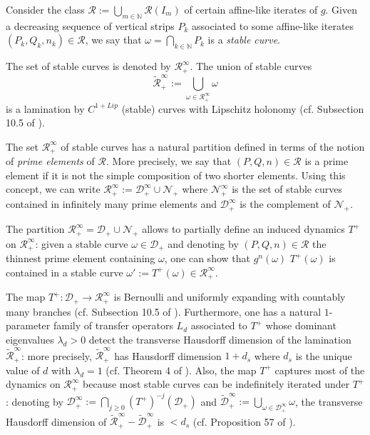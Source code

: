 \documentclass[12pt]{amsart}
\numberwithin{equation}{section}
\theoremstyle{definition}
\newcommand{\<}{{\langle}}
\renewcommand{\>}{{\rangle}}
\begin{document}
Consider the class $\mathcal{R}:=\bigcup\limits_{m\in\mathbb{N}}\mathcal{R}(I_m)$ of certain affine-like iterates of $g$. Given a decreasing sequence of vertical strips $P_k$ associated to some affine-like iterates $(P_k, Q_k, n_k)\in\mathcal{R}$, we say that $\omega=\bigcap\limits_{k\in\mathbb{N}} P_k$ is a \emph{stable curve}. 

The set of stable curves is denoted by $\mathcal{R}^{\infty}_+$. The union of stable curves 
$$\widetilde{\mathcal{R}}^{\infty}_+:=\bigcup\limits_{\omega\in\mathcal{R}^{\infty}_+}\omega$$ 
is a lamination by $C^{1+Lip}$ (stable) curves with Lipschitz holonomy (cf. Subsection 10.5 of \cite{PY09}). 

The set $\mathcal{R}^{\infty}_+$ of stable curves has a natural partition defined in terms of the notion of \emph{prime elements} of $\mathcal{R}$. More precisely, we say that $(P,Q,n)\in\mathcal{R}$ is a prime element if it is not the simple composition of two shorter elements. Using this concept, we can write  $\mathcal{R}^{\infty}_+ := \mathcal{D}^{\infty}_+\cup\mathcal{N}_+$ where $\mathcal{N}^{\infty}_+$ is the set of stable curves contained in infinitely many prime elements and $\mathcal{D}^{\infty}_+$ is the complement of $\mathcal{N}_+$. 

The partition $\mathcal{R}^{\infty}_+ = \mathcal{D}_+\cup\mathcal{N}_+$ allows to partially define an induced dynamics $T^+$ on $\mathcal{R}^{\infty}_+$: given a stable curve $\omega\in\mathcal{D}_+$ and denoting by $(P,Q,n)\in\mathcal{R}$ the thinnest prime element containing $\omega$, one can show that $g^n(\omega)$ $T^+(\omega)$ is contained in a stable curve $\omega':=T^+(\omega)\in\mathcal{R}^{\infty}_+$. 

The map $T^+:\mathcal{D}_+\to\mathcal{R}^{\infty}_+$ is Bernoulli and uniformly expanding with countably many branches (cf. Subsection 10.5 of \cite{PY09}). Furthermore, one has a natural $1$-parameter family of transfer operators $L_d$ associated to $T^+$ whose dominant eigenvalues $\lambda_d>0$ detect the transverse Hausdorff dimension of the lamination $\widetilde{\mathcal{R}}^{\infty}_+$: more precisely, $\widetilde{\mathcal{R}}^{\infty}_+$ has Hausdorff dimension $1+d_s$ where $d_s$ is the unique value of $d$ with $\lambda_d=1$ (cf. Theorem 4 of \cite{PY09}). Also, the map $T^+$ captures most of the dynamics on $\mathcal{R}^{\infty}_+$ because most stable curves can be indefinitely iterated under $T^+$: denoting by $\mathcal{D}^{\infty}_+:=\bigcap\limits_{j\geq 0}(T^+)^{-j}(\mathcal{D}_+)$ and $\widetilde{\mathcal{D}}^{\infty}_+:=\bigcup\limits_{\omega\in \mathcal{D}^{\infty}_+}\omega$, the transverse Hausdorff dimension of $\widetilde{\mathcal{R}}^{\infty}_+ - \widetilde{\mathcal{D}}^{\infty}_+$ is $<d_s$ (cf. Proposition 57 of \cite{PY09}).
\end{document}
